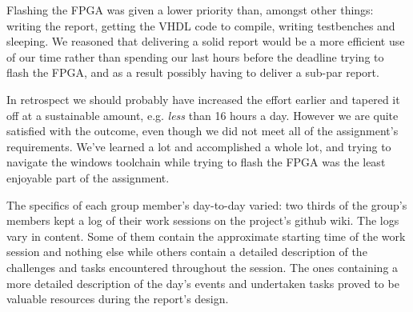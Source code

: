 Flashing the FPGA was given a lower priority than, amongst other things: writing the report, getting the VHDL code to compile, writing testbenches and sleeping.
We reasoned that delivering a solid report would be a more efficient use of our time rather than spending our last hours before the deadline trying to flash the FPGA, and as a result possibly having to deliver a sub-par report.

In retrospect we should probably have increased the effort earlier and tapered it off at a sustainable amount, e.g. \textit{less} than 16 hours a day.
However we are quite satisfied with the outcome, even though we did not meet all of the assignment's requirements.
We've learned a lot and accomplished a whole lot, and trying to navigate the windows toolchain while trying to flash the FPGA was the least enjoyable part of the assignment.

The specifics of each group member's day-to-day varied: two thirds of the group's members kept a log of their work sessions on the project's github wiki. 
The logs vary in content.
Some of them contain the approximate starting time of the work session and nothing else while others contain a detailed description of the challenges and tasks encountered throughout the session.
The ones containing a more detailed description of the day's events and undertaken tasks proved to be valuable resources during the report's design.

